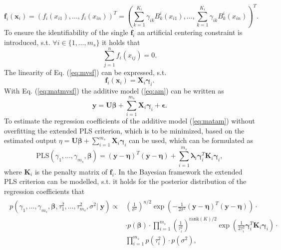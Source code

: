 \documentclass[12pt,letterpaper]{article}
\numberwithin{equation}{subsection}
\begin{document}
\begin{equation}
\mathbf{f}_i(\mathbf{x}_i) = (f_i(x_{i1}),\dots,f_i(x_{in}))^T = (\sum^{K_i}_{k=1}\gamma_{ik} B^i_k(x_{i1}),\dots,\sum^{K_i}_{k=1}\gamma_{ik} B^i_k(x_{in}))^T.
\label{eq:mvsf}
\end{equation}
To ensure the identifiability of the single $\mathbf{f}_i$ an artificial centering constraint is introduced, s.t. $\forall i \in \{1,\dots ,m_{s}\}$ it holds that
\begin{equation}
\sum^n_{j=1}f_i(x_{ij}) = 0.
\end{equation}  
The linearity of Eq. (\ref{eq:mvsf}) can be expressed, s.t. 
\begin{equation}
\mathbf{f}_i(\mathbf{x}_i) = \mathbf{X}_i\mathbf{\gamma}_i.
\label{eq:matmvsf}
\end{equation}
With Eq. (\ref{eq:matmvsf}) the additive model (\ref{eq:am}) can be written as
\begin{equation}
\mathbf{y} = \mathbf{U}\mathbf{\beta} +  \sum^{m_s}_{i=1} \mathbf{X}_i\mathbf{\gamma}_i + \mathbf{\epsilon}.
\label{eq:matam}
\end{equation}
To estimate the regression coefficients of the additive model (\ref{eq:matam}) without overfitting the extended PLS criterion, which is to be minimized, based on the estimated output $\eta = \mathbf{U}\mathbf{\beta} +  \sum^{m_s}_{i=1} \mathbf{X}_i\mathbf{\gamma}_i$
can be used, which can be formulated as
\begin{equation}
\text{PLS}(\gamma_1,\dots ,\gamma_{m_s},\mathbf{\beta}) = (\mathbf{y} - \mathbf{\eta})^T(\mathbf{y} - \mathbf{\eta}) + \sum^{m_s}_{i=1} \mathbf{\lambda}_i\mathbf{\gamma}_i^T\mathbf{K}_i\mathbf{\gamma}_i,
\end{equation}
where $\mathbf{K}_i$ is the penalty matrix of $\mathbf{f}_i$. In the Bayesian framework the extended PLS criterion can be modelled, s.t. it holds for the posterior distribution of the regression coefficients that 
\begin{align}
\begin{split}
p(\gamma_1,\dots ,\gamma_{m_s},\mathbf{\beta},\tau^2_1,\dots,\tau^2_{m_s},\sigma^2| \; \mathbf{y}) \propto &
(\frac{1}{\sigma^2})^{n/2}\exp(-\frac{1}{2\sigma^2}(\mathbf{y} - \mathbf{\eta})^T(\mathbf{y} - \mathbf{\eta})) \cdot \\
& \cdot p(\mathbf{\beta}) \cdot \prod^{m_s}_{i=1}(\frac{1}{\tau^2_i})^{\text{rank}(K)/2}\exp(\frac{1}{2\tau_i^2}\mathbf{\gamma}_i^T\mathbf{K}_i\mathbf{\gamma}_i) \cdot \\
& \prod^{m_s}_{i=1}  p(\tau^2_i)  \cdot  p(\sigma^2),
\end{split}
\end{align}
\end{document}
